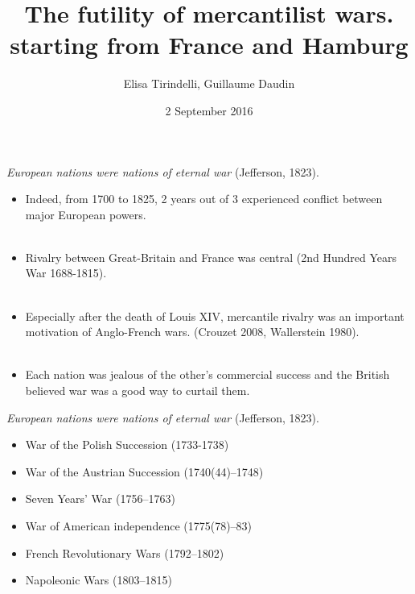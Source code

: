 \documentclass[11pt]{beamer}
\author{Elisa Tirindelli, Guillaume Daudin}
\title{The futility of mercantilist wars. starting from France and Hamburg}
\date{2 September 2016}
\begin{document}
\begin{frame}
\titlepage
\end{frame}


\begin{frame}{\textit{European nations were nations of eternal war} (Jefferson, 1823).}
\begin{itemize}
\item{Indeed, from 1700 to 1825, 2 years out of 3 experienced conflict between major European powers.}\\~\\

\item{Rivalry between Great-Britain and France was central (2nd Hundred Years War 1688-1815).}\\~\\

\item{Especially after the death of Louis XIV, mercantile rivalry was an important motivation of Anglo-French wars. (Crouzet 2008, Wallerstein 1980).}\\~\\

\item{Each nation was jealous of the other's commercial success and the British believed war was a good way to curtail them.}
\end{itemize}
\end{frame}


\begin{frame}{\textit{European nations were nations of eternal war} (Jefferson, 1823).}
\begin{itemize}
\item{War of the Polish Succession (1733-1738)}
\item{War of the Austrian Succession (1740(44)–1748)}
\item{Seven Years' War (1756–1763)}
\item{War of American independence (1775(78)–83)}
\item{French Revolutionary Wars (1792–1802)}
\item{Napoleonic Wars (1803–1815)}
\end{itemize}
\end{frame}
\end{document}
